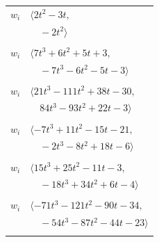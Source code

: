 \documentclass[11pt]{article}
\begin{document}
\begin{longtable}{@{}ll@{}}
$w_i$ & $\langle 2t^{2}-3t,$\\
 & $\quad -2t^{2}\rangle$\\
\addlinespace[2pt]
\multicolumn{2}{@{}p{0.97\textwidth}@{}}{$i=33$, $D_i=2$, $\rho_{ij}$: $5{:}1, \allowbreak 23{:}1, \allowbreak 27{:}2, \allowbreak 43{:}2, \allowbreak 45{:}1, \allowbreak 52{:}1, \allowbreak 55{:}1, \allowbreak 57{:}1, \allowbreak 61{:}2$}\\
$w_i$ & $\langle 7t^{3}+6t^{2}+5t+3,$\\
 & $\quad -7t^{3}-6t^{2}-5t-3\rangle$\\
\addlinespace[2pt]
\multicolumn{2}{@{}p{0.97\textwidth}@{}}{$i=34$, $D_i=4$, $\rho_{ij}$: $24{:}1, \allowbreak 32{:}1, \allowbreak 35{:}2, \allowbreak 39{:}2, \allowbreak 41{:}2, \allowbreak 43{:}2, \allowbreak 48{:}2, \allowbreak 55{:}2$}\\
$w_i$ & $\langle 21t^{3}-111t^{2}+38t-30,$\\
 & $\quad 84t^{3}-93t^{2}+22t-3\rangle$\\
\addlinespace[2pt]
\multicolumn{2}{@{}p{0.97\textwidth}@{}}{$i=35$, $D_i=4$, $\rho_{ij}$: $8{:}1, \allowbreak 21{:}2, \allowbreak 23{:}2, \allowbreak 24{:}2, \allowbreak 34{:}1, \allowbreak 55{:}1, \allowbreak 56{:}2, \allowbreak 59{:}1$}\\
$w_i$ & $\langle -7t^{3}+11t^{2}-15t-21,$\\
 & $\quad -2t^{3}-8t^{2}+18t-6\rangle$\\
\addlinespace[2pt]
\multicolumn{2}{@{}p{0.97\textwidth}@{}}{$i=36$, $D_i=2$, $\rho_{ij}$: $18{:}2, \allowbreak 19{:}2, \allowbreak 24{:}2, \allowbreak 26{:}1, \allowbreak 27{:}1, \allowbreak 39{:}1, \allowbreak 43{:}1, \allowbreak 44{:}2$}\\
$w_i$ & $\langle 15t^{3}+25t^{2}-11t-3,$\\
 & $\quad -18t^{3}+34t^{2}+6t-4\rangle$\\
\addlinespace[2pt]
\multicolumn{2}{@{}p{0.97\textwidth}@{}}{$i=37$, $D_i=8$, $\rho_{ij}$: $2{:}2, \allowbreak 12{:}2, \allowbreak 20{:}1, \allowbreak 21{:}2, \allowbreak 22{:}1, \allowbreak 25{:}1, \allowbreak 28{:}1, \allowbreak 43{:}2, \allowbreak 45{:}1, \allowbreak 62{:}1$}\\
$w_i$ & $\langle -71t^{3}-121t^{2}-90t-34,$\\
 & $\quad -54t^{3}-87t^{2}-44t-23\rangle$\\
\addlinespace[2pt]
\multicolumn{2}{@{}p{0.97\textwidth}@{}}{$i=38$, $D_i=2$, $\rho_{ij}$: $7{:}1, \allowbreak 27{:}2, \allowbreak 31{:}1, \allowbreak 42{:}2, \allowbreak 46{:}2, \allowbreak 50{:}1, \allowbreak 55{:}2$}\\

\end{longtable}
\end{document}
